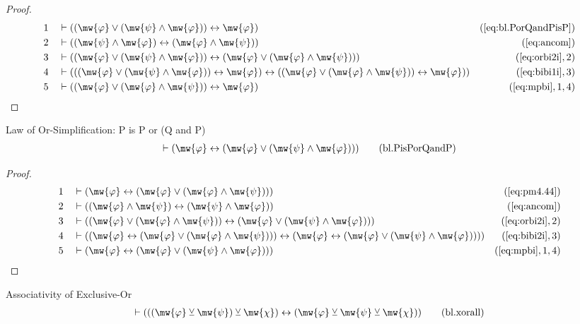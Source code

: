 \begin{proof}
\begin{align}
  1 &&  & \vdash ( ( \mw{\varphi} \vee ( \mw{\psi} \wedge \mw{\varphi} ) )
     \leftrightarrow \mw{\varphi}
     )&(\mbox{\ref{eq:bl.PorQandPisP}})\notag
  \\ 2 &&  & \vdash ( ( \mw{\psi} \wedge \mw{\varphi} ) \leftrightarrow (
     \mw{\varphi} \wedge \mw{\psi} )
     )&(\mbox{\ref{eq:ancom}})\notag
  \\ 3 &&  & \vdash ( ( \mw{\varphi} \vee ( \mw{\psi} \wedge \mw{\varphi} ) )
     \leftrightarrow ( \mw{\varphi} \vee ( \mw{\varphi}
     \wedge \mw{\psi} ) )
     )&(\mbox{\ref{eq:orbi2i}},2)\notag
  \\ 4 &&  & \vdash ( ( ( \mw{\varphi} \vee ( \mw{\psi} \wedge \mw{\varphi} ) )
     \leftrightarrow \mw{\varphi} ) \leftrightarrow ( (
     \mw{\varphi} \vee ( \mw{\varphi} \wedge \mw{\psi} ) )
     \leftrightarrow \mw{\varphi} )
     )&(\mbox{\ref{eq:bibi1i}},3)\notag
  \\ 5 &&  & \vdash ( ( \mw{\varphi} \vee ( \mw{\varphi} \wedge \mw{\psi} ) )
     \leftrightarrow \mw{\varphi}
     )&(\mbox{\ref{eq:mpbi}},1,4)\notag
\end{align}
\end{proof}

\begin{lemma} {Law of Or-Simplification: P is P or
(Q and P)}
\begin{align}
\vdash ( \mw{\varphi} \leftrightarrow ( \mw{\varphi} \vee ( \mw{\psi} \wedge
    \mw{\varphi} ) ) )\label{eq:bl.PisPorQandP}\tag{bl.PisPorQandP}
\end{align}
\end{lemma}


\begin{proof}
\begin{align}
  1 &&  & \vdash ( \mw{\varphi} \leftrightarrow ( \mw{\varphi} \vee (
     \mw{\varphi} \wedge \mw{\psi} ) )
     )&(\mbox{\ref{eq:pm4.44}})\notag
  \\ 2 &&  & \vdash ( ( \mw{\varphi} \wedge \mw{\psi} ) \leftrightarrow (
     \mw{\psi} \wedge \mw{\varphi} )
     )&(\mbox{\ref{eq:ancom}})\notag
  \\ 3 &&  & \vdash ( ( \mw{\varphi} \vee ( \mw{\varphi} \wedge \mw{\psi} ) )
     \leftrightarrow ( \mw{\varphi} \vee ( \mw{\psi}
     \wedge \mw{\varphi} ) )
     )&(\mbox{\ref{eq:orbi2i}},2)\notag
  \\ 4 &&  & \vdash ( ( \mw{\varphi} \leftrightarrow ( \mw{\varphi} \vee (
     \mw{\varphi} \wedge \mw{\psi} ) ) ) \leftrightarrow (
     \mw{\varphi} \leftrightarrow ( \mw{\varphi} \vee (
     \mw{\psi} \wedge \mw{\varphi} ) ) )
     )&(\mbox{\ref{eq:bibi2i}},3)\notag
  \\ 5 &&  & \vdash ( \mw{\varphi} \leftrightarrow ( \mw{\varphi} \vee (
     \mw{\psi} \wedge \mw{\varphi} ) )
     )&(\mbox{\ref{eq:mpbi}},1,4)\notag
\end{align}
\end{proof}

\begin{lemma} {Associativity of Exclusive-Or}
\begin{align}
\vdash ( ( ( \mw{\varphi} \veebar \mw{\psi} ) \veebar \mw{\chi} )
    \leftrightarrow ( \mw{\varphi} \veebar \mw{\psi} \veebar \mw{\chi} )
    )\label{eq:bl.xorall}\tag{bl.xorall}
\end{align}
\end{lemma}


